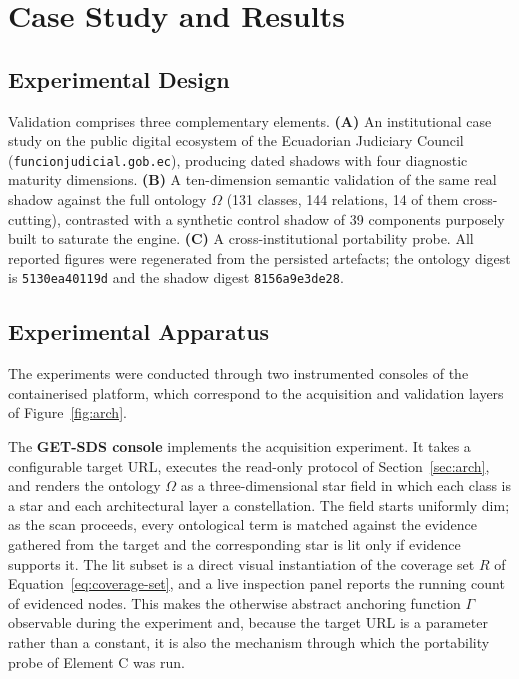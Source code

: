 \documentclass[engproc,article,submit,moreauthors]{Definitions/mdpi}
\begin{document}
\section{Case Study and Results}
\label{sec:results}

\subsection{Experimental Design}
Validation comprises three complementary elements. \textbf{(A)} An institutional case study on the public digital ecosystem of the Ecuadorian Judiciary Council (\texttt{funcionjudicial\-.gob\-.ec}), producing dated shadows with four diagnostic maturity dimensions. \textbf{(B)} A ten-dimension semantic validation of the same real shadow against the full ontology $\Omega$ (131 classes, 144 relations, 14 of them cross-cutting), contrasted with a synthetic control shadow of 39 components purposely built to saturate the engine. \textbf{(C)} A cross-institutional portability probe. All reported figures were regenerated from the persisted artefacts; the ontology digest is \texttt{5130ea40119d} and the shadow digest \texttt{8156a9e3de28}.

\subsection{Experimental Apparatus}
\label{sec:apparatus}
The experiments were conducted through two instrumented consoles of the containerised platform, which correspond to the acquisition and validation layers of Figure~\ref{fig:arch}.

The \textbf{GET-SDS console} implements the acquisition experiment. It takes a configurable target URL, executes the read-only protocol of Section~\ref{sec:arch}, and renders the ontology $\Omega$ as a three-dimensional star field in which each class is a star and each architectural layer a constellation. The field starts uniformly dim; as the scan proceeds, every ontological term is matched against the evidence gathered from the target and the corresponding star is lit only if evidence supports it. The lit subset is a direct visual instantiation of the coverage set $R$ of Equation~\eqref{eq:coverage-set}, and a live inspection panel reports the running count of evidenced nodes. This makes the otherwise abstract anchoring function $\Gamma$ observable during the experiment and, because the target URL is a parameter rather than a constant, it is also the mechanism through which the portability probe of Element C was run.
\end{document}
